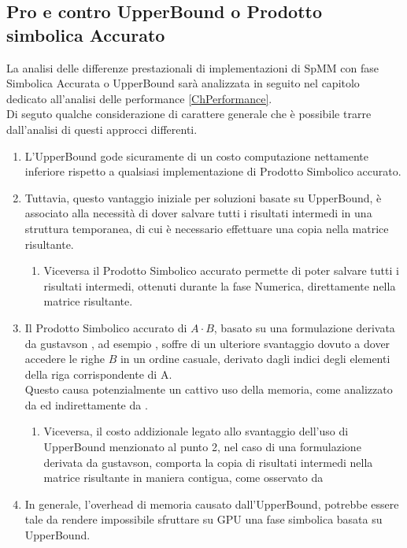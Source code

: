 \subsection{Pro e contro UpperBound o Prodotto simbolica Accurato} \label{chSpMMSymb:UB_VS_SYMBACC}
La analisi delle differenze prestazionali di implementazioni di SpMM con fase Simbolica Accurata o UpperBound
sarà analizzata in seguito nel capitolo dedicato all'analisi delle performance \ref{ChPerformance}.\\
Di seguto qualche considerazione di carattere generale che è possibile trarre dall'analisi di questi approcci differenti.\\
\begin{enumerate}
	\item L'UpperBound gode sicuramente di un costo computazione nettamente inferiore 
	      rispetto a qualsiasi implementazione di Prodotto Simbolico accurato.\\
	\item Tuttavia, questo vantaggio iniziale per soluzioni basate su UpperBound, 
		  è associato alla necessità di dover salvare tutti i risultati intermedi in una struttura temporanea,
		  di cui è necessario effettuare una copia nella matrice risultante.
	\begin{enumerate}
		\item Viceversa il Prodotto Simbolico accurato permette di poter salvare tutti i risultati intermedi,
			  ottenuti durante la fase Numerica, direttamente nella matrice risultante.
	\end{enumerate}
	\item Il Prodotto Simbolico  accurato di $A \cdot B$, 
		  basato su una formulazione derivata da gustavson \cite{gustavson}, ad esempio \rowbyrow,
		  soffre di un ulteriore svantaggio dovuto a dover accedere le righe $B$ in un ordine casuale, derivato 
		  dagli indici degli elementi \nnz della riga corrispondente di A.\\
		  Questo causa potenzialmente un cattivo uso della memoria, come analizzato da 
		  \cite{Sp3MM_for_AMG} ed indirettamente da \cite{ESC}.
	\begin{enumerate}
		\label{chSpMMSymb:UB_VS_SYMBACC_rowbyrowContiguousCopyBack}
		\item Viceversa, il costo addizionale legato allo svantaggio dell'uso di UpperBound menzionato al punto 2,
			  nel caso di una formulazione derivata da gustavson, comporta la copia di risultati intermedi 
			  nella matrice risultante in maniera contigua, come osservato da \cite{Sp3MM_for_AMG}
	\end{enumerate}
	\item In generale, l'overhead di memoria causato dall'UpperBound, potrebbe essere tale da rendere impossibile 
		  sfruttare su GPU una fase simbolica basata su UpperBound. %
\end{enumerate}
